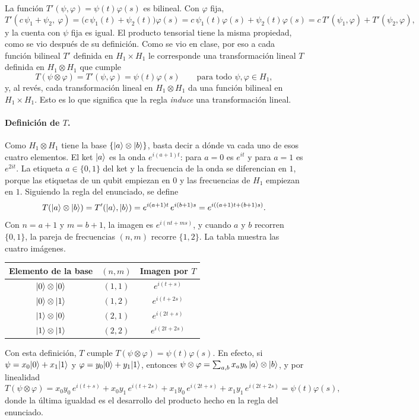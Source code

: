 La función $T'(\psi,\varphi)=\psi(t)\varphi(s)$ es bilineal. Con $\varphi$ fija,
\[
  T'(c\,\psi_1+\psi_2,\ \varphi)=\bigl(c\,\psi_1(t)+\psi_2(t)\bigr)\varphi(s)=c\,\psi_1(t)\varphi(s)+\psi_2(t)\varphi(s)=c\,T'(\psi_1,\varphi)+T'(\psi_2,\varphi),
\]
y la cuenta con $\psi$ fija es igual. El producto tensorial tiene la misma propiedad, como se vio después de su definición. Como se vio en clase, por eso a cada función bilineal $T'$ definida en $H_1\times H_1$ le corresponde una transformación lineal $T$ definida en $H_1\otimes H_1$ que cumple
\[
  T(\psi\otimes\varphi)=T'(\psi,\varphi)=\psi(t)\varphi(s)\qquad\text{para todo }\psi,\varphi\in H_1 ,
\]
y, al revés, cada transformación lineal en $H_1\otimes H_1$ da una función bilineal en $H_1\times H_1$. Esto es lo que significa que la regla \emph{induce} una transformación lineal.

\paragraph{Definición de $T$.} Como $H_1\otimes H_1$ tiene la base $\{\lvert a\rangle\otimes\lvert b\rangle\}$, basta decir a dónde va cada uno de esos cuatro elementos. El ket $\lvert a\rangle$ es la onda $e^{i(a+1)t}$: para $a=0$ es $e^{it}$ y para $a=1$ es $e^{2it}$. La etiqueta $a\in\{0,1\}$ del ket y la frecuencia de la onda se diferencian en $1$, porque las etiquetas de un qubit empiezan en $0$ y las frecuencias de $H_1$ empiezan en $1$. Siguiendo la regla del enunciado, se define
\[
  T(\lvert a\rangle\otimes\lvert b\rangle)=T'(\lvert a\rangle,\lvert b\rangle)=e^{i(a+1)t}\,e^{i(b+1)s}=e^{i((a+1)t+(b+1)s)} .
\]
Con $n=a+1$ y $m=b+1$, la imagen es $e^{i(nt+ms)}$, y cuando $a$ y $b$ recorren $\{0,1\}$, la pareja de frecuencias $(n,m)$ recorre $\{1,2\}$. La tabla muestra las cuatro imágenes.
\begin{center}
\renewcommand{\arraystretch}{1.3}
\begin{tabular}{ccc}
  Elemento de la base & $(n,m)$ & Imagen por $T$\\\hline
  $\lvert 0\rangle\otimes\lvert 0\rangle$ & $(1,1)$ & $e^{i(t+s)}$\\
  $\lvert 0\rangle\otimes\lvert 1\rangle$ & $(1,2)$ & $e^{i(t+2s)}$\\
  $\lvert 1\rangle\otimes\lvert 0\rangle$ & $(2,1)$ & $e^{i(2t+s)}$\\
  $\lvert 1\rangle\otimes\lvert 1\rangle$ & $(2,2)$ & $e^{i(2t+2s)}$
\end{tabular}
\end{center}
Con esta definición, $T$ cumple $T(\psi\otimes\varphi)=\psi(t)\varphi(s)$. En efecto, si $\psi=x_0\lvert 0\rangle+x_1\lvert 1\rangle$ y $\varphi=y_0\lvert 0\rangle+y_1\lvert 1\rangle$, entonces $\psi\otimes\varphi=\sum_{a,b}x_ay_b\,\lvert a\rangle\otimes\lvert b\rangle$, y por linealidad
\[
  T(\psi\otimes\varphi)=x_0y_0\,e^{i(t+s)}+x_0y_1\,e^{i(t+2s)}+x_1y_0\,e^{i(2t+s)}+x_1y_1\,e^{i(2t+2s)}=\psi(t)\varphi(s),
\]
donde la última igualdad es el desarrollo del producto hecho en la regla del enunciado.

